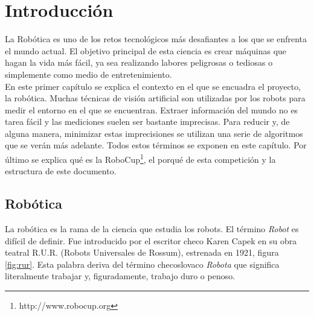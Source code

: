 \chapter{Introducción}
\label{cap:introduccion}

La Robótica es uno de los retos tecnológicos más desafiantes a los que se enfrenta el mundo actual. El objetivo principal de esta ciencia es crear máquinas que hagan la vida más fácil, ya sea realizando labores peligrosas o tediosas o simplemente como medio de entretenimiento.\\

En este primer capítulo se explica el contexto en el que se encuadra el proyecto, la robótica. Muchas técnicas de visión artificial son utilizadas por los robots para medir el entorno en el que se encuentran. Extraer información del mundo no es tarea fácil y las mediciones suelen ser bastante imprecisas. Para reducir y, de alguna manera, minimizar estas imprecisiones se utilizan una serie de algoritmos que se verán más adelante. Todos estos términos se exponen en este capítulo. Por último se explica qué es la RoboCup\footnote{http://www.robocup.org}, el porqué de esta competición y la estructura de este documento.

\section{Robótica}
\label{sec:robotica}

La robótica es la rama de la ciencia que estudia los robots. El término \textit{Robot} es difícil de definir. Fue introducido por el escritor checo Karen Capek en su obra teatral R.U.R. (Robots Universales de Rossum), estrenada en 1921, figura \ref{fig:rur}. Esta palabra deriva del término checoslovaco \textit{Robota} que significa literalmente trabajar y, figuradamente, trabajo duro o penoso. \\

